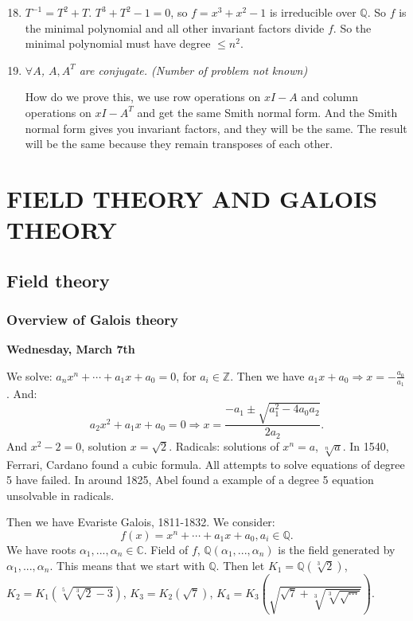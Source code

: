 \documentclass[9pt,reqno,twoside]{amsbook}
\theoremstyle{plain}
\numberwithin{section}{chapter}
\numberwithin{equation}{chapter}
\theoremstyle{definition}
\theoremstyle{remark}
\theoremstyle{plain}
\newcommand{\z}{\mathbb{Z}}
\newcommand{\Q}{\mathbb{Q}}
\renewcommand{\c}{\mathbb{C}}
\newcommand{\fracc}{\frac}
\renewcommand{\leq}{\leqslant}
\begin{document}
\begin{enumerate}[label = \arabic*.]
\setcounter{enumi}{17}
\item $T^{-1} = T^2 + T$. $T^3 + T^2 - 1 = 0$, so $f = x^3 + x^2 - 1$ is irreducible over $\mathbb{Q}$. So $f$ is the minimal polynomial and all other invariant factors divide $f$. So the minimal polynomial must have degree $\leq n^2$. 





\item \textit{$\forall A$, $A,A^T$ are conjugate. (Number of problem not known)}

How do we prove this, we use row operations on $xI - A$ and column operations on $xI - A^T$ and get the same Smith normal form. And the Smith normal form gives you invariant factors, and they will be the same. The result will be the same because they remain transposes of each other. 







\end{enumerate}

\part{FIELD THEORY AND GALOIS THEORY}


\chapter{Field theory}

\setcounter{section}{-1}

\section{Overview of Galois theory}

\textbf{Wednesday, March 7th}

We solve: $a_nx^n + \cdots + a_1x + a_0 = 0$, for $a_i \in \z$. Then we have $a_1x + a_0 \Rightarrow x = -\fracc{a_0}{a_1}$. And:
$$
a_2x^2 + a_1x + a_0 = 0 \Rightarrow x = \fracc{-a_1 \pm \sqrt{a_1^2 - 4a_0a_2}}{2a_2}.
$$
And $x^2 - 2 = 0$, solution $x = \sqrt{2}$. Radicals: solutions of $x^n = a$, $\sqrt[n]{a}$. In 1540, Ferrari, Cardano found a cubic formula. All attempts to solve equations of degree 5 have failed. In around 1825, Abel found a example of a degree 5 equation unsolvable in radicals. 



Then we have Evariste Galois, 1811-1832. We consider:
$$
f(x) = x^n + \cdots + a_1x + a_0, a_i \in \Q.
$$
We have roots $\alpha_1,...,\alpha_n \in \c$. Field of $f$, $\Q(\alpha_1,...,\alpha_n)$ is the field generated by $\alpha_1,...,\alpha_n$. This means that we start with $\Q$. Then let $K_1 = \Q(\sqrt[3]{2})$, $K_2 = K_1(\sqrt[5]{\sqrt[3]{2} - 3})$, $K_3 = K_2(\sqrt{7})$, $K_4 = K_3(\sqrt{\sqrt{7} + \sqrt[3]{\sqrt[3]{
\sqrt{\cdots}}}})$. 
\end{document}
